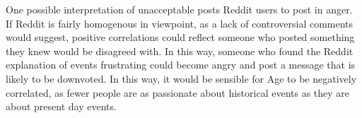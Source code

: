 One possible interpretation of unacceptable posts  Reddit users to post in anger. If Reddit is fairly homogenous in viewpoint, as a lack of controversial comments would suggest, positive correlations could reflect someone who posted something they knew would be disagreed with. In this way, someone who found the Reddit explanation of events frustrating could become angry and post a message that is likely to be downvoted. In this way, it would be sensible for Age to be negatively correlated, as fewer people are as passionate about historical events as they are about present day events.